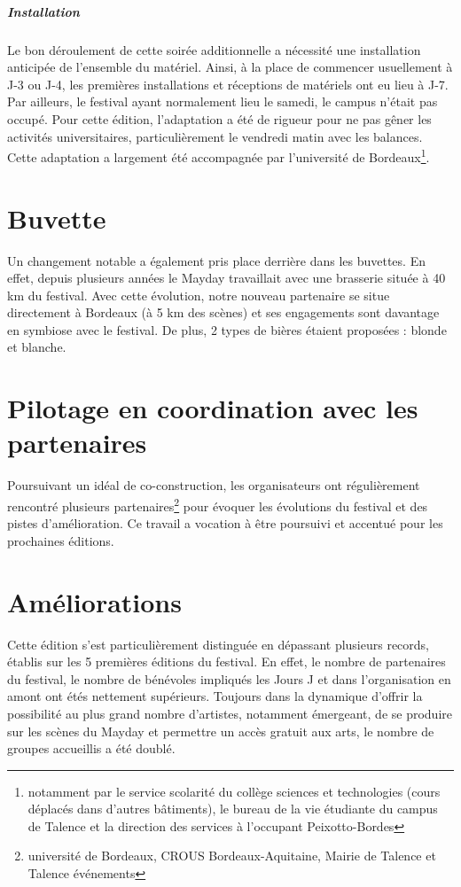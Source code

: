 \documentclass[12pt,a4paper]{report}
\begin{document}
\subparagraph{Installation}
Le bon déroulement de cette soirée additionnelle a nécessité une installation anticipée de l'ensemble du matériel. Ainsi, à la place de commencer usuellement à J-3 ou J-4, les premières installations et réceptions de matériels ont eu lieu à J-7. Par ailleurs, le festival ayant normalement lieu le samedi, le campus n'était pas occupé. Pour cette édition, l’adaptation a été de rigueur pour ne pas gêner les activités universitaires, particulièrement le vendredi matin avec les balances. Cette adaptation a largement été accompagnée par l'université de Bordeaux\footnote{notamment par le service scolarité du collège sciences et technologies (cours déplacés dans d'autres bâtiments), le bureau de la vie étudiante du campus de Talence et la direction des services à l'occupant Peixotto-Bordes}.

\section{Buvette}
Un changement notable a également pris place derrière dans les buvettes. En effet, depuis plusieurs années le Mayday travaillait avec une brasserie située à 40 km du festival. Avec cette évolution, notre nouveau partenaire se situe directement à Bordeaux (à 5 km des scènes) et ses engagements sont davantage en symbiose avec le festival. De plus, 2 types de bières étaient proposées : blonde et blanche.

\section{Pilotage en coordination avec les partenaires}
Poursuivant un idéal de co-construction, les organisateurs ont régulièrement rencontré plusieurs partenaires\footnote{université de Bordeaux, CROUS Bordeaux-Aquitaine, Mairie de Talence et Talence événements} pour évoquer les évolutions du festival et des pistes d’amélioration. Ce travail a vocation à être poursuivi et accentué pour les prochaines éditions.

\section{Améliorations}
Cette édition s'est particulièrement distinguée en dépassant plusieurs records, établis sur les 5 premières éditions du festival. En effet, le nombre de partenaires du festival, le nombre de bénévoles impliqués les Jours J et dans l'organisation en amont ont étés nettement supérieurs. Toujours dans la dynamique d'offrir la possibilité au plus grand nombre d'artistes, notamment émergeant, de se produire sur les scènes du Mayday et permettre un accès gratuit aux arts, le nombre de groupes accueillis a été doublé.\\
\end{document}
